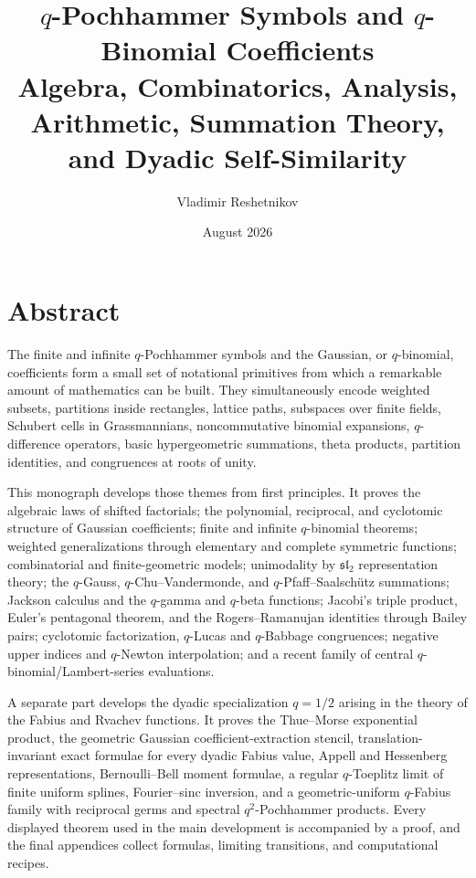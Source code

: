 \documentclass[11pt,oneside,openany]{book}
\title{\Huge\bfseries $q$-Pochhammer Symbols and $q$-Binomial Coefficients\\[8pt]
\Large Algebra, Combinatorics, Analysis, Arithmetic, Summation Theory,\\[3pt]
and Dyadic Self-Similarity}
\author{Vladimir Reshetnikov}
\date{August 2026}
\theoremstyle{definition}
\theoremstyle{remark}
\begin{document}
\frontmatter
\hypersetup{pageanchor=false}
\maketitle
\hypersetup{pageanchor=true}

\chapter*{Abstract}
The finite and infinite $q$-Pochhammer symbols and the Gaussian, or $q$-binomial, coefficients form a small set of notational primitives from which a remarkable amount of mathematics can be built.  They simultaneously encode weighted subsets, partitions inside rectangles, lattice paths, subspaces over finite fields, Schubert cells in Grassmannians, noncommutative binomial expansions, $q$-difference operators, basic hypergeometric summations, theta products, partition identities, and congruences at roots of unity.

This monograph develops those themes from first principles.  It proves the algebraic laws of shifted factorials; the polynomial, reciprocal, and cyclotomic structure of Gaussian coefficients; finite and infinite $q$-binomial theorems; weighted generalizations through elementary and complete symmetric functions; combinatorial and finite-geometric models; unimodality by $\mathfrak{sl}_2$ representation theory; the $q$-Gauss, $q$-Chu--Vandermonde, and $q$-Pfaff--Saalsch\"utz summations; Jackson calculus and the $q$-gamma and $q$-beta functions; Jacobi's triple product, Euler's pentagonal theorem, and the Rogers--Ramanujan identities through Bailey pairs; cyclotomic factorization, $q$-Lucas and $q$-Babbage congruences; negative upper indices and $q$-Newton interpolation; and a recent family of central $q$-binomial/Lambert-series evaluations.

A separate part develops the dyadic specialization $q=1/2$ arising in the theory of the Fabius and Rvachev functions.  It proves the Thue--Morse exponential product, the geometric Gaussian coefficient-extraction stencil, translation-invariant exact formulae for every dyadic Fabius value, Appell and Hessenberg representations, Bernoulli--Bell moment formulae, a regular $q$-Toeplitz limit of finite uniform splines, Fourier--sinc inversion, and a geometric-uniform $q$-Fabius family with reciprocal germs and spectral $q^2$-Pochhammer products.  Every displayed theorem used in the main development is accompanied by a proof, and the final appendices collect formulas, limiting transitions, and computational recipes.
\end{document}
